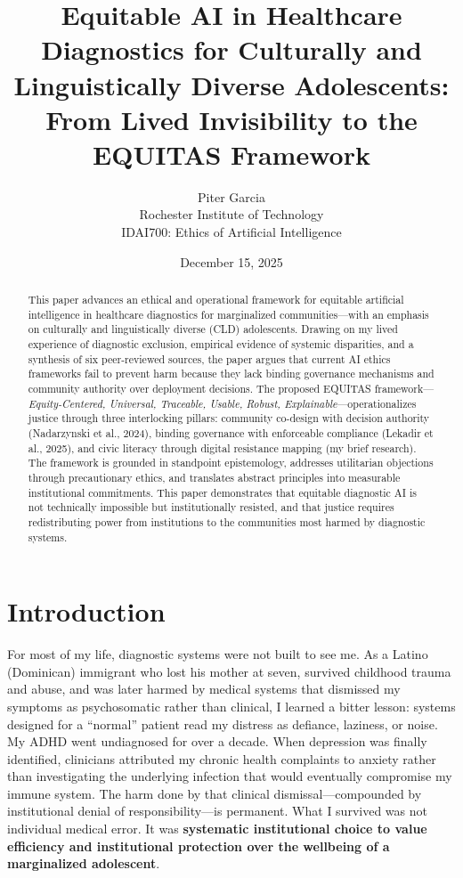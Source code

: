 \documentclass[12pt,a4paper]{article}
\title{\textbf{Equitable AI in Healthcare Diagnostics for Culturally and Linguistically Diverse Adolescents:\\From Lived Invisibility to the EQUITAS Framework}}
\author{Piter Garcia\\Rochester Institute of Technology\\IDAI700: Ethics of Artificial Intelligence}
\date{December 15, 2025}
\begin{document}
\maketitle


\newpage
\begin{abstract}
This paper advances an ethical and operational framework for equitable artificial intelligence in healthcare diagnostics for marginalized communities---with an emphasis on culturally and linguistically diverse (CLD) adolescents. Drawing on my lived experience of diagnostic exclusion, empirical evidence of systemic disparities, and a synthesis of six peer-reviewed sources, the paper argues that current AI ethics frameworks fail to prevent harm because they lack binding governance mechanisms and community authority over deployment decisions. The proposed EQUITAS framework---\textit{Equity-Centered, Universal, Traceable, Usable, Robust, Explainable}---operationalizes justice through three interlocking pillars: community co-design with decision authority (Nadarzynski et al., 2024), binding governance with enforceable compliance (Lekadir et al., 2025), and civic literacy through digital resistance mapping (my brief research). The framework is grounded in standpoint epistemology, addresses utilitarian objections through precautionary ethics, and translates abstract principles into measurable institutional commitments. This paper demonstrates that equitable diagnostic AI is not technically impossible but institutionally resisted, and that justice requires redistributing power from institutions to the communities most harmed by diagnostic systems.
\end{abstract}

\newpage
{\footnotesize\tableofcontents}
\newpage

\section{Introduction}

For most of my life, diagnostic systems were not built to see me. As a Latino (Dominican) immigrant who lost his mother at seven, survived childhood trauma and abuse, and was later harmed by medical systems that dismissed my symptoms as psychosomatic rather than clinical, I learned a bitter lesson: systems designed for a ``normal'' patient read my distress as defiance, laziness, or noise. My ADHD went undiagnosed for over a decade. When depression was finally identified, clinicians attributed my chronic health complaints to anxiety rather than investigating the underlying infection that would eventually compromise my immune system. The harm done by that clinical dismissal—compounded by institutional denial of responsibility—is permanent. What I survived was not individual medical error. It was \textbf{systematic institutional choice to value efficiency and institutional protection over the wellbeing of a marginalized adolescent}.
\end{document}
